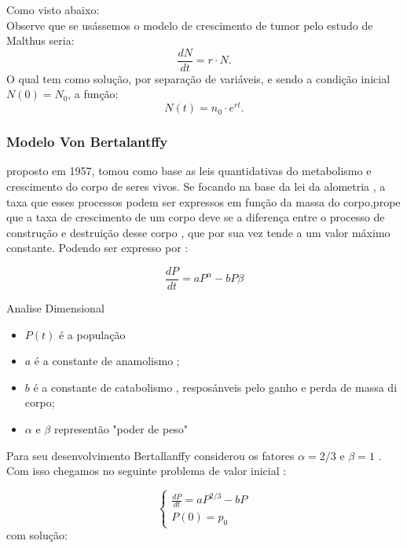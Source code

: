 Como visto abaixo:\\

Observe que se usássemos o modelo de crescimento de tumor pelo estudo de Malthus seria:
\begin{equation*}
\dfrac{dN}{dt} = r \cdot N.
\end{equation*}
O qual tem como solução, por separação de variáveis, e sendo a condição inicial $N(0)=N_0$, a função:
\begin{equation*}
N(t) = n_0\cdot e^{rt}.
\end{equation*}




\subsubsection{ Modelo Von Bertalantffy}

proposto em 1957, tomou como base as leis quantidativas do metabolismo e crescimento do corpo de seres vivos. Se focando na base da lei da alometria , a taxa que esses processos podem ser expressos em função da massa do corpo,prope que a taxa de crescimento de um corpo deve se a diferença entre o processo de construção e destruição desse corpo , que por sua vez tende a um valor máximo constante. Podendo ser expresso por :

\begin{equation*}
    \frac{dP}{dt} =aP^{\alpha}-bP{\beta}
\end{equation*}

Analise Dimensional
\begin{itemize}
    \item $P(t)$ é a população
    \item $a$ é a  constante de anamolismo ;
    \item $b$ é a  constante de catabolismo , resposánveis pelo ganho e perda de massa di corpo;
    \item $\alpha$ e $\beta$ representão "poder de peso"
\end{itemize}
Para seu desenvolvimento Bertallanffy considerou os fatores $\alpha = 2/3$ e $\beta=1$ . Com isso chegamos no seguinte problema de valor inicial :

    \begin{equation*}
\begin{cases}
  \frac{dP}{dt} =aP^{2/3}- 
   bP\\
   P(0)=p_0  
\end{cases}
\end{equation*}
com solução:

